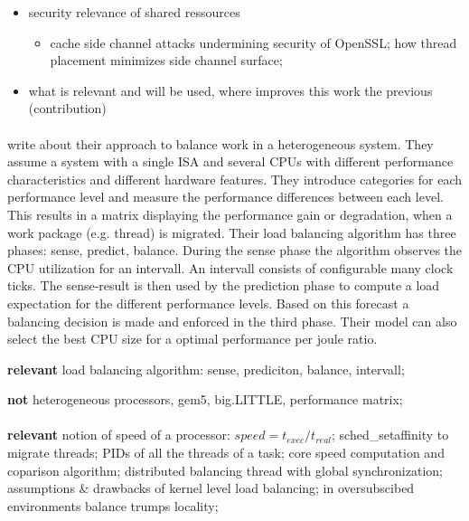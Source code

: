 \begin{itemize}
  \item security relevance of shared ressources
    \begin{itemize}
  \item cache side channel attacks undermining security of OpenSSL; how thread
    placement minimizes side channel surface;
    \end{itemize}

  \item what is relevant and will be used, where improves this work the
    previous (contribution)
  \end{itemize}

\paragraph{ \cite{sarma_smartbalance_2015} }
\citeauthor{sarma_smartbalance_2015} write about their approach to balance work
in a heterogeneous system.
They assume a system with a single ISA and several CPUs with different performance
characteristics and different hardware features.
They introduce categories for each performance level and measure the
performance differences between each level.
This results in a matrix displaying the performance gain or degradation, when
a work package (e.g. thread) is migrated.
Their load balancing algorithm has three phases: sense, predict, balance.
During the sense phase the algorithm observes the CPU utilization for an intervall.
An intervall consists of configurable many clock ticks.
The sense-result is then used by the prediction phase to compute a load
expectation for the different performance levels.
Based on this forecast a balancing decision is made and enforced in the third
phase.
Their model can also select the best CPU size for a optimal performance per
joule ratio.

\textbf{relevant} load balancing algorithm: sense, prediciton, balance,
intervall;

\textbf{not} heterogeneous processors, gem5, big.LITTLE, performance
matrix;

\paragraph{ \cite{hofmeyr_load_2010} }

\textbf{relevant} notion of speed of a processor: $speed = t_{exec}/t_{real}$;
sched\_setaffinity to migrate threads; PIDs of all the threads of a task;
core speed computation and coparison algorithm;
distributed balancing thread with global synchronization;
assumptions \& drawbacks of kernel level load balancing;
in oversubscibed environments balance trumps locality;


